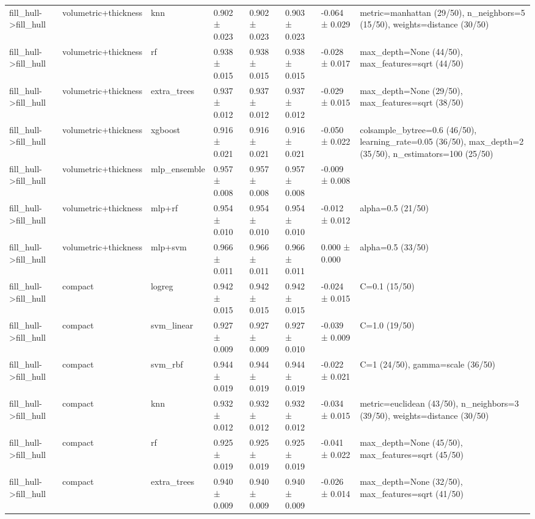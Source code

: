 \begin{tabular}{llllllll}
fill\_hull->fill\_hull & volumetric+thickness & knn & 0.902 ± 0.023 & 0.902 ± 0.023 & 0.903 ± 0.023 & -0.064 ± 0.029 & metric=manhattan (29/50), n\_neighbors=5 (15/50), weights=distance (30/50) \\
fill\_hull->fill\_hull & volumetric+thickness & rf & 0.938 ± 0.015 & 0.938 ± 0.015 & 0.938 ± 0.015 & -0.028 ± 0.017 & max\_depth=None (44/50), max\_features=sqrt (44/50) \\
fill\_hull->fill\_hull & volumetric+thickness & extra\_trees & 0.937 ± 0.012 & 0.937 ± 0.012 & 0.937 ± 0.012 & -0.029 ± 0.015 & max\_depth=None (29/50), max\_features=sqrt (38/50) \\
fill\_hull->fill\_hull & volumetric+thickness & xgboost & 0.916 ± 0.021 & 0.916 ± 0.021 & 0.916 ± 0.021 & -0.050 ± 0.022 & colsample\_bytree=0.6 (46/50), learning\_rate=0.05 (36/50), max\_depth=2 (35/50), n\_estimators=100 (25/50) \\
fill\_hull->fill\_hull & volumetric+thickness & mlp\_ensemble & 0.957 ± 0.008 & 0.957 ± 0.008 & 0.957 ± 0.008 & -0.009 ± 0.008 &  \\
fill\_hull->fill\_hull & volumetric+thickness & mlp+rf & 0.954 ± 0.010 & 0.954 ± 0.010 & 0.954 ± 0.010 & -0.012 ± 0.012 & alpha=0.5 (21/50) \\
fill\_hull->fill\_hull & volumetric+thickness & mlp+svm & 0.966 ± 0.011 & 0.966 ± 0.011 & 0.966 ± 0.011 & 0.000 ± 0.000 & alpha=0.5 (33/50) \\
fill\_hull->fill\_hull & compact & logreg & 0.942 ± 0.015 & 0.942 ± 0.015 & 0.942 ± 0.015 & -0.024 ± 0.015 & C=0.1 (15/50) \\
fill\_hull->fill\_hull & compact & svm\_linear & 0.927 ± 0.009 & 0.927 ± 0.009 & 0.927 ± 0.010 & -0.039 ± 0.009 & C=1.0 (19/50) \\
fill\_hull->fill\_hull & compact & svm\_rbf & 0.944 ± 0.019 & 0.944 ± 0.019 & 0.944 ± 0.019 & -0.022 ± 0.021 & C=1 (24/50), gamma=scale (36/50) \\
fill\_hull->fill\_hull & compact & knn & 0.932 ± 0.012 & 0.932 ± 0.012 & 0.932 ± 0.012 & -0.034 ± 0.015 & metric=euclidean (43/50), n\_neighbors=3 (39/50), weights=distance (30/50) \\
fill\_hull->fill\_hull & compact & rf & 0.925 ± 0.019 & 0.925 ± 0.019 & 0.925 ± 0.019 & -0.041 ± 0.022 & max\_depth=None (45/50), max\_features=sqrt (45/50) \\
fill\_hull->fill\_hull & compact & extra\_trees & 0.940 ± 0.009 & 0.940 ± 0.009 & 0.940 ± 0.009 & -0.026 ± 0.014 & max\_depth=None (32/50), max\_features=sqrt (41/50) \\

\end{tabular}
